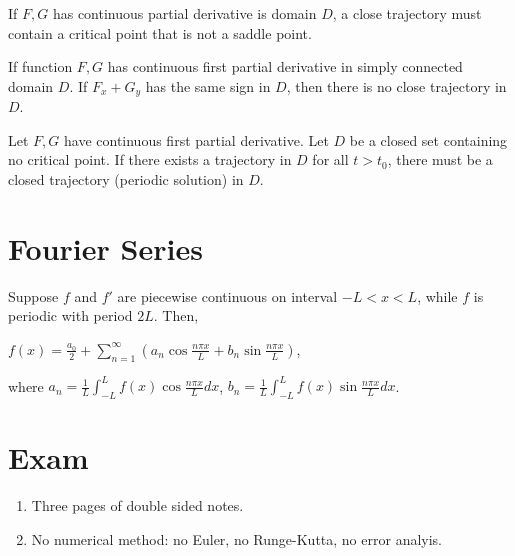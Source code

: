 \documentclass[12pt]{article}
\begin{document}
\begin{theorem}
If $F,G$ has continuous partial derivative is domain $D$, a close trajectory must contain a critical point that is not a saddle point.
\end{theorem}

\begin{theorem}
If function $F, G$ has continuous first partial derivative in simply connected domain $D$. If $F_x + G_y$ has the same sign in $D$, then there is no close trajectory in $D$.
\end{theorem}

\begin{theorem}
	Let $F,G$ have continuous first partial derivative. Let $D$ be a closed set containing no critical point. If there exists a trajectory in $D$ for all $t>t_0$, there must be a closed trajectory (periodic solution) in $D$.
\end{theorem}

\section{Fourier Series}
\begin{theorem}
	Suppose $f$ and $f'$ are piecewise continuous on interval $-L < x < L$, while $f$ is periodic with period $2L$. Then,

	$f(x) = \frac{a_0}{2} + \sum_{n=1}^{\infty} (a_n \cos{\frac{n\pi x}{L}} + b_n \sin{\frac{n\pi x}{L}})$,

	where $a_n = \frac{1}{L} \int_{-L}^{L} f(x) \cos{\frac{n\pi x}{L}} dx$, $b_n = \frac{1}{L} \int_{-L}^{L} f(x) \sin{\frac{n\pi x}{L}} dx$.
\end{theorem}

\section{Exam}
\begin{enumerate}
	\item Three pages of double sided notes.
	\item No numerical method: no Euler, no Runge-Kutta, no error analyis.
\end{enumerate}
\end{document}
